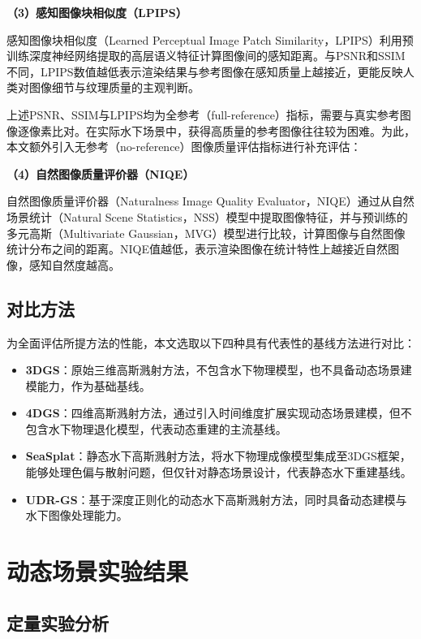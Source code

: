 \textbf{（3）感知图像块相似度（LPIPS）}

感知图像块相似度（Learned Perceptual Image Patch Similarity，LPIPS）利用预训练深度神经网络提取的高层语义特征计算图像间的感知距离。与PSNR和SSIM不同，LPIPS数值越低表示渲染结果与参考图像在感知质量上越接近，更能反映人类对图像细节与纹理质量的主观判断。

上述PSNR、SSIM与LPIPS均为全参考（full-reference）指标，需要与真实参考图像逐像素比对。在实际水下场景中，获得高质量的参考图像往往较为困难。为此，本文额外引入无参考（no-reference）图像质量评估指标进行补充评估：

\textbf{（4）自然图像质量评价器（NIQE）}

自然图像质量评价器（Naturalness Image Quality Evaluator，NIQE）通过从自然场景统计（Natural Scene Statistics，NSS）模型中提取图像特征，并与预训练的多元高斯（Multivariate Gaussian，MVG）模型进行比较，计算图像与自然图像统计分布之间的距离。NIQE值越低，表示渲染图像在统计特性上越接近自然图像，感知自然度越高。

\subsection{对比方法}

为全面评估所提方法的性能，本文选取以下四种具有代表性的基线方法进行对比：

\begin{itemize}
  \item \textbf{3DGS}：原始三维高斯溅射方法，不包含水下物理模型，也不具备动态场景建模能力，作为基础基线。
  \item \textbf{4DGS}：四维高斯溅射方法，通过引入时间维度扩展实现动态场景建模，但不包含水下物理退化模型，代表动态重建的主流基线。
  \item \textbf{SeaSplat}：静态水下高斯溅射方法，将水下物理成像模型集成至3DGS框架，能够处理色偏与散射问题，但仅针对静态场景设计，代表静态水下重建基线。
  \item \textbf{UDR-GS}：基于深度正则化的动态水下高斯溅射方法，同时具备动态建模与水下图像处理能力。
\end{itemize}



\section{动态场景实验结果}

\subsection{定量实验分析}

